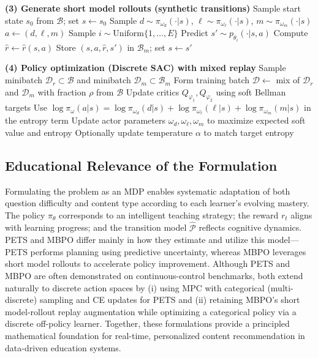 \documentclass[preprint,12pt]{elsarticle}
\begin{document}
\begin{frontmatter}
\begin{algorithm}[H]
\begin{algorithmic}[1]
    \State \textbf{(3) Generate short model rollouts (synthetic transitions)}
        \State Sample start state $s_0$ from $\mathcal{B}$; set $s \gets s_0$
            \State Sample $d \sim \pi_{\omega_d}(\cdot|s)$, $\ell \sim \pi_{\omega_\ell}(\cdot|s)$, $m \sim \pi_{\omega_m}(\cdot|s)$
            \State $a \gets (d,\ell,m)$
            \State Sample $i \sim \mathrm{Uniform}\{1,\dots,E\}$
            \State Predict $s' \sim p_{\theta_i}(\cdot|s,a)$
            \State Compute $\hat r \gets \hat r(s,a)$ 
            \State Store $(s,a,\hat r,s')$ in $\mathcal{B}_m$; set $s \gets s'$
        \EndFor
    \EndFor

    \State \textbf{(4) Policy optimization (Discrete SAC) with mixed replay}
        \State Sample minibatch $\mathcal{D}_r \subset \mathcal{B}$ and minibatch $\mathcal{D}_m \subset \mathcal{B}_m$
        \State Form training batch $\mathcal{D} \gets$ mix of $\mathcal{D}_r$ and $\mathcal{D}_m$ with fraction $\rho$ from $\mathcal{B}$
        \State Update critics $Q_{\varphi_1},Q_{\varphi_2}$ using soft Bellman targets
        \State Use $\log\pi_\omega(a|s)=\log\pi_{\omega_d}(d|s)+\log\pi_{\omega_\ell}(\ell|s)+\log\pi_{\omega_m}(m|s)$ in the entropy term
        \State Update actor parameters $\omega_d,\omega_\ell,\omega_m$ to maximize expected soft value and entropy
        \State Optionally update temperature $\alpha$ to match target entropy
    \EndFor
\EndFor
\end{algorithmic}
\end{algorithm}

\subsection{Educational Relevance of the Formulation}
Formulating the problem as an MDP enables systematic adaptation of both question difficulty and content type according to each learner’s evolving mastery.  
The policy $\pi_\theta$ corresponds to an intelligent teaching strategy; the reward $r_t$ aligns with learning progress; and the transition model $\hat{\mathcal{P}}$ reflects cognitive dynamics.  
PETS and MBPO differ mainly in how they estimate and utilize this model—PETS performs planning using predictive uncertainty, whereas MBPO leverages short model rollouts to accelerate policy improvement. Although PETS and MBPO are often demonstrated on continuous-control benchmarks, both extend naturally to discrete action spaces by (i) using MPC with categorical (multi-discrete) sampling and CE updates for PETS and (ii) retaining MBPO’s short model-rollout replay augmentation while optimizing a categorical policy via a discrete off-policy learner. Together, these formulations provide a principled mathematical foundation for real-time, personalized content recommendation in data-driven education systems.


\end{frontmatter}
\end{document}
